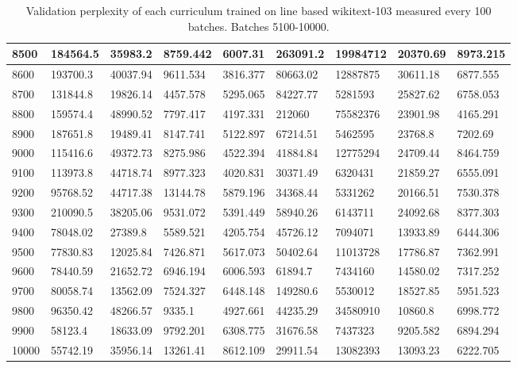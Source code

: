 \documentclass [11pt, proquest] {uwthesis}[2020/12/20]
\begin{document}
\begin{table}
\begin{tiny}
\begin{tabular}{|l|l|l|l|l|l|l|l|l|}
8500 & 184564.5 & 35983.2 & 8759.442 & 6007.31 & 263091.2 & 19984712 & 20370.69 & 8973.215 \\\hline
8600 & 193700.3 & 40037.94 & 9611.534 & 3816.377 & 80663.02 & 12887875 & 30611.18 & 6877.555 \\\hline
8700 & 131844.8 & 19826.14 & 4457.578 & 5295.065 & 84227.77 & 5281593 & 25827.62 & 6758.053 \\\hline
8800 & 159574.4 & 48990.52 & 7797.417 & 4197.331 & 212060 & 75582376 & 23901.98 & 4165.291 \\\hline
8900 & 187651.8 & 19489.41 & 8147.741 & 5122.897 & 67214.51 & 5462595 & 23768.8 & 7202.69 \\\hline
9000 & 115416.6 & 49372.73 & 8275.986 & 4522.394 & 41884.84 & 12775294 & 24709.44 & 8464.759 \\\hline
9100 & 113973.8 & 44718.74 & 8977.323 & 4020.831 & 30371.49 & 6320431 & 21859.27 & 6555.091 \\\hline
9200 & 95768.52 & 44717.38 & 13144.78 & 5879.196 & 34368.44 & 5331262 & 20166.51 & 7530.378 \\\hline
9300 & 210090.5 & 38205.06 & 9531.072 & 5391.449 & 58940.26 & 6143711 & 24092.68 & 8377.303 \\\hline
9400 & 78048.02 & 27389.8 & 5589.521 & 4205.754 & 45726.12 & 7094071 & 13933.89 & 6444.306 \\\hline
9500 & 77830.83 & 12025.84 & 7426.871 & 5617.073 & 50402.64 & 11013728 & 17786.87 & 7362.991 \\\hline
9600 & 78440.59 & 21652.72 & 6946.194 & 6006.593 & 61894.7 & 7434160 & 14580.02 & 7317.252 \\\hline
9700 & 80058.74 & 13562.09 & 7524.327 & 6448.148 & 149280.6 & 5530012 & 18527.85 & 5951.523 \\\hline
9800 & 96350.42 & 48266.57 & 9335.1 & 4927.661 & 44235.29 & 34580910 & 10860.8 & 6998.772 \\\hline
9900 & 58123.4 & 18633.09 & 9792.201 & 6308.775 & 31676.58 & 7437323 & 9205.582 & 6894.294 \\\hline
10000 & 55742.19 & 35956.14 & 13261.41 & 8612.109 & 29911.54 & 13082393 & 13093.23 & 6222.705 \\\hline
\end{tabular}
\end{tiny}
\caption{Validation perplexity of each curriculum trained on line based wikitext-103 measured every 100 batches. Batches 5100-10000.}
\label{tab:wikitext-103-line-2}
\end{table}
\end{document}

